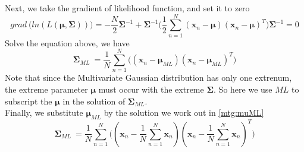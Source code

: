 \documentclass[11pt,a4paper]{article}
\newcommand{\htab}{\hspace*{0.63cm}}
\newcommand{\bmu}{\boldsymbol{\mu}}
\newcommand{\bsum}{\boldsymbol{\Sigma}}
\newcommand{\xnv}{\boldsymbol{x}_{n} }
\begin{document}
\htab Next, we take the gradient of likelihood function, and set it to zero
    \begin{equation}
        grad \ \Big( ln(L(\bmu,\bsum))\Big) = -\frac{N}{2} \bsum^{-1} +
         \bsum^{-1} \Big( \frac{1}{2} \sum_{n=1}^{N}  (\xnv-\bmu) (\xnv-\bmu)^{T}  \Big) \bsum^{-1} = 0
    \end{equation}
\htab Solve the equation above, we have
    \begin{equation}
    \bsum_{ML} \
        = \frac{1}{N}  \sum_{n=1}^{N} \Big( (\xnv - \bmu_{ML})  (\xnv - \bmu_{ML})^{T} \Big)
    \end{equation}
\htab Note that since the Multivariate Gaussian distribution has only one extrenum, the extreme parameter $\bmu$ must occur with the extreme $\bsum$. So here we use $ML$ to subscript the $\bmu$ in the solution of $\bsum_{ML}$.\\
\htab Finally, we substitute $\bmu_{ML}$ by the solution we work out in \eqref{mtg:muML}
\begin{equation}  \label{mtg:sumML}
        \bsum_{ML} \
        = \frac{1}{N}  \sum_{n=1}^{N} \Big( (\xnv - \frac{1}{N} \sum_{n=1}^{N} \xnv)
        (\xnv - \frac{1}{N} \sum_{n=1}^{N} \xnv)^{T} \Big)
    \end{equation}
\newpage
\end{document}
